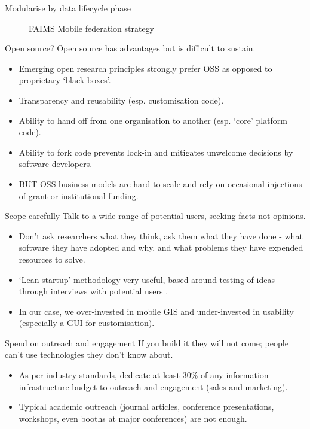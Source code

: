 \documentclass[
	aspectratio=169, %
	12pt, %
	t, %
]{beamer}
\begin{document}
\begin{refsegment}
\begin{frame}{Modularise by data lifecycle phase}
\begin{figure}[H]
        \caption{FAIMS Mobile federation strategy}
        \label{fig:figure13}
 \end{figure}
\end{frame}
\begin{frame}{Open source?}
  Open source has advantages but is difficult to sustain.
      \begin{itemize}
        \item Emerging open research principles strongly prefer OSS as opposed to proprietary ‘black boxes’.
        \item Transparency and reusability (esp. customisation code).
        \item Ability to hand off from one organisation to another (esp. `core' platform code).
        \item Ability to fork code prevents lock-in and mitigates unwelcome decisions by software developers.
        \item BUT OSS business models are hard to scale and rely on occasional injections of grant or institutional funding.
    \end{itemize}
\end{frame}
\begin{frame}{Scope carefully}
  Talk to a wide range of potential users, seeking facts not opinions.
      \begin{itemize}
        \item Don’t ask researchers what they think, ask them what they have done - what software they have adopted and why, and what problems they have expended resources to solve. 
        \item ‘Lean startup’ methodology very useful, based around  testing of ideas through interviews with potential users \parencite{Strategyzer_AG2019-uu}.
        \item In our case, we over-invested in mobile GIS and under-invested in usability (especially a GUI for customisation).
    \end{itemize}
\end{frame}
\begin{frame}{Spend on outreach and engagement}
  If you build it they will not come; people can't use technologies they don't know about.
      \begin{itemize}
        \item As per industry standards, dedicate at least 30\% of any information infrastructure budget to outreach and engagement (sales and marketing). 
        \item Typical academic outreach (journal articles, conference presentations, workshops, even booths at major conferences) are not enough.
    \end{itemize}
\end{frame}

\end{refsegment}
\end{document}
